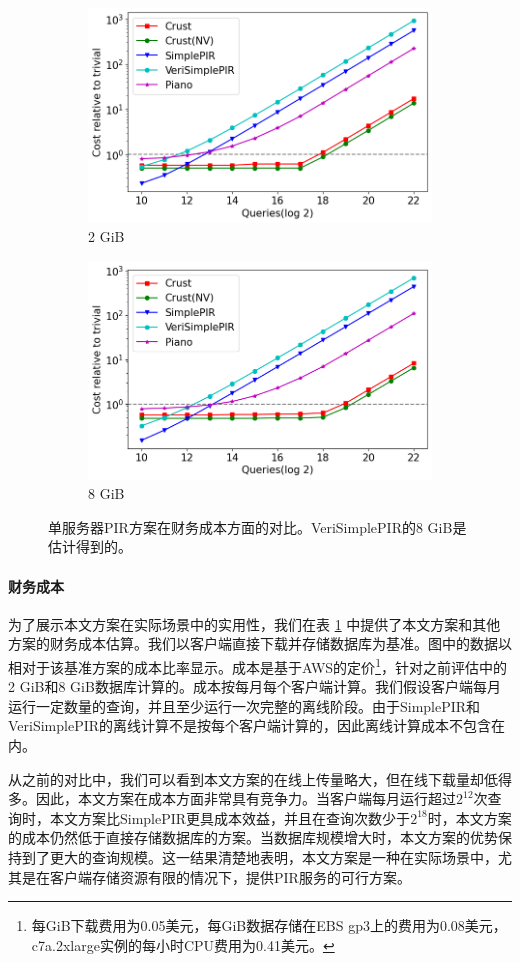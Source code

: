 \begin{figure}
    \begin{subfigure}{0.5\textwidth}
        \centering
        \includegraphics[width=0.8\linewidth]{figure/cost_2gb.png}
        \caption{2 GiB}
    \end{subfigure}%
    \begin{subfigure}{0.5\textwidth}
        \centering
        \includegraphics[width=0.8\linewidth]{figure/cost_8gb.png}
        \caption{8 GiB}
    \end{subfigure}%
    \caption{单服务器PIR方案在财务成本方面的对比。VeriSimplePIR的8 GiB是估计得到的。}
    \label{fig:single-server-cost}
\end{figure}

\paragraph{财务成本}
为了展示本文方案在实际场景中的实用性，我们在表 \ref{fig:single-server-cost} 中提供了本文方案和其他方案的财务成本估算。我们以客户端直接下载并存储数据库为基准。图中的数据以相对于该基准方案的成本比率显示。成本是基于AWS的定价\footnote{每GiB下载费用为0.05美元，每GiB数据存储在EBS gp3上的费用为0.08美元，c7a.2xlarge实例的每小时CPU费用为0.41美元。}，针对之前评估中的2 GiB和8 GiB数据库计算的。成本按每月每个客户端计算。我们假设客户端每月运行一定数量的查询，并且至少运行一次完整的离线阶段。由于SimplePIR和VeriSimplePIR的离线计算不是按每个客户端计算的，因此离线计算成本不包含在内。

从之前的对比中，我们可以看到本文方案的在线上传量略大，但在线下载量却低得多。因此，本文方案在成本方面非常具有竞争力。当客户端每月运行超过$2^{12}$次查询时，本文方案比SimplePIR更具成本效益，并且在查询次数少于$2^{18}$时，本文方案的成本仍然低于直接存储数据库的方案。当数据库规模增大时，本文方案的优势保持到了更大的查询规模。这一结果清楚地表明，本文方案是一种在实际场景中，尤其是在客户端存储资源有限的情况下，提供PIR服务的可行方案。